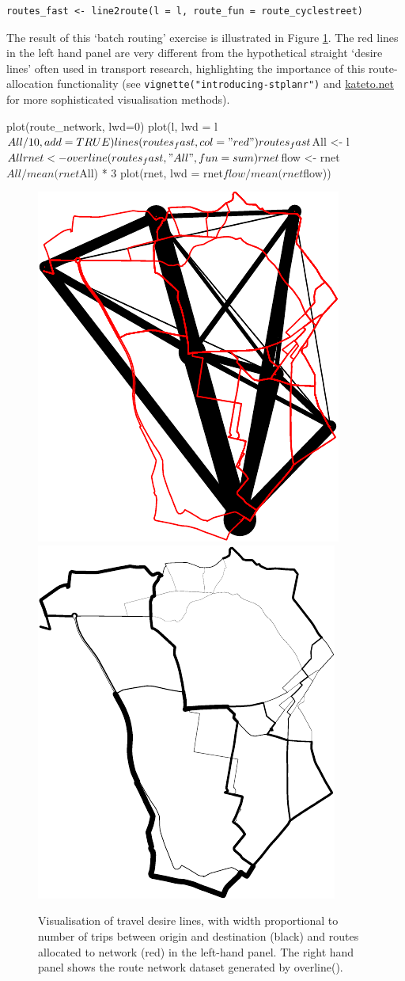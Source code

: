 \begin{verbatim}
routes_fast <- line2route(l = l, route_fun = route_cyclestreet)
\end{verbatim}

The result of this `batch routing' exercise is illustrated in Figure
\ref{fig:lines_routes}. The red lines in the left hand panel are very
different from the hypothetical straight `desire lines' often used in
transport research, highlighting the importance of this route-allocation
functionality (see \texttt{vignette("introducing-stplanr")} and \href{http://kateto.net/network-visualization}{kateto.net} for more sophisticated visualisation methods).

\begin{Schunk}
\begin{Sinput}
plot(route_network, lwd=0)
plot(l, lwd = l$All / 10, add = TRUE)
lines(routes_fast, col = "red")
routes_fast$All <- l$All
rnet <- overline(routes_fast, "All", fun = sum)
rnet$flow <- rnet$All / mean(rnet$All) * 3
plot(rnet, lwd = rnet$flow / mean(rnet$flow))
\end{Sinput}
\begin{figure}
\includegraphics[width=0.5\linewidth]{lines_routes-1} \includegraphics[width=0.5\linewidth]{lines_routes-2} \caption[Visualisation of travel desire lines, with width proportional to number of trips between origin and destination (black) and routes allocated to network  (red) in the left-hand panel]{Visualisation of travel desire lines, with width proportional to number of trips between origin and destination (black) and routes allocated to network  (red) in the left-hand panel. The right hand panel shows the route network dataset generated by overline().}\label{fig:lines_routes}

\end{figure}
\end{Schunk}
